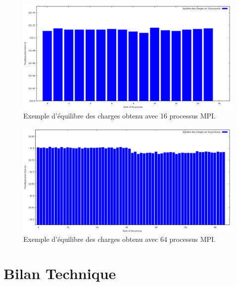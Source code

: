 	\begin{frame}
	\begin{figure}[!ht]	
		\begin{center}\includegraphics[scale=0.35]{equilibre8.png}\end{center}
		\caption{Exemple d'équilibre des charges obtenu avec 16 processus MPI.}
		\label{fg:fig6}
	\end{figure}	
	\end{frame}
	
	\begin{frame}
	\begin{figure}[!ht]	
		\begin{center}\includegraphics[scale=0.35]{equilibre64.png}\end{center}
		\caption{Exemple d'équilibre des charges obtenu avec 64 processus MPI.}
		\label{fg:fig7}
	\end{figure}	
	\end{frame}
	
	\section{Bilan Technique}
	\begin{frame}
	
	\end{frame}
	
